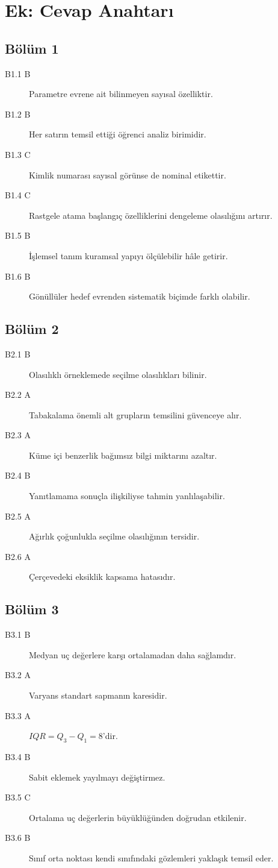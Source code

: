 \chapter*{Ek: Cevap Anahtarı}

\section*{Bölüm 1}
\begin{description}
\item[B1.1 B] Parametre evrene ait bilinmeyen sayısal özelliktir.
\item[B1.2 B] Her satırın temsil ettiği öğrenci analiz birimidir.
\item[B1.3 C] Kimlik numarası sayısal görünse de nominal etikettir.
\item[B1.4 C] Rastgele atama başlangıç özelliklerini dengeleme olasılığını artırır.
\item[B1.5 B] İşlemsel tanım kuramsal yapıyı ölçülebilir hâle getirir.
\item[B1.6 B] Gönüllüler hedef evrenden sistematik biçimde farklı olabilir.
\end{description}

\section*{Bölüm 2}
\begin{description}
\item[B2.1 B] Olasılıklı örneklemede seçilme olasılıkları bilinir.
\item[B2.2 A] Tabakalama önemli alt grupların temsilini güvenceye alır.
\item[B2.3 A] Küme içi benzerlik bağımsız bilgi miktarını azaltır.
\item[B2.4 B] Yanıtlamama sonuçla ilişkiliyse tahmin yanlılaşabilir.
\item[B2.5 A] Ağırlık çoğunlukla seçilme olasılığının tersidir.
\item[B2.6 A] Çerçevedeki eksiklik kapsama hatasıdır.
\end{description}

\section*{Bölüm 3}
\begin{description}
\item[B3.1 B] Medyan uç değerlere karşı ortalamadan daha sağlamdır.
\item[B3.2 A] Varyans standart sapmanın karesidir.
\item[B3.3 A] $IQR=Q_3-Q_1=8$'dir.
\item[B3.4 B] Sabit eklemek yayılmayı değiştirmez.
\item[B3.5 C] Ortalama uç değerlerin büyüklüğünden doğrudan etkilenir.
\item[B3.6 B] Sınıf orta noktası kendi sınıfındaki gözlemleri yaklaşık temsil eder.
\end{description}

